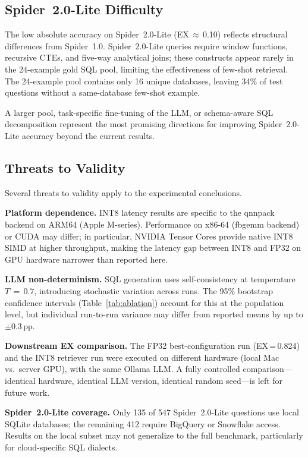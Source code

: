\subsection{Spider~2.0-Lite Difficulty}

The low absolute accuracy on Spider~2.0-Lite (EX\,$\approx$\,0.10)
reflects structural differences from Spider~1.0.
Spider~2.0-Lite queries require window functions, recursive CTEs,
and five-way analytical joins; these constructs appear rarely in the
24-example gold SQL pool, limiting the effectiveness of few-shot retrieval.
The 24-example pool contains only 16 unique databases, leaving 34\%
of test questions without a same-database few-shot example.

A larger pool, task-specific fine-tuning of the LLM, or schema-aware
SQL decomposition represent the most promising directions
for improving Spider~2.0-Lite accuracy beyond the current results.

\subsection{Threats to Validity}
\label{sec:threats}

Several threats to validity apply to the experimental conclusions.

\textbf{Platform dependence.}
INT8 latency results are specific to the qnnpack backend on ARM64 (Apple
M-series).
Performance on x86-64 (fbgemm backend) or CUDA may differ; in particular,
NVIDIA Tensor Cores provide native INT8 SIMD at higher throughput,
making the latency gap between INT8 and FP32 on GPU hardware narrower
than reported here.

\textbf{LLM non-determinism.}
SQL generation uses self-consistency at temperature $T\,=\,0.7$, introducing
stochastic variation across runs.
The 95\% bootstrap confidence intervals (Table~\ref{tab:ablation}) account
for this at the population level, but individual run-to-run variance
may differ from reported means by up to $\pm$0.3\,pp.

\textbf{Downstream EX comparison.}
The FP32 best-configuration run (EX\,=\,0.824) and the INT8 retriever
run were executed on different hardware (local Mac vs.\ server GPU), with
the same Ollama LLM.
A fully controlled comparison---identical hardware, identical LLM version,
identical random seed---is left for future work.

\textbf{Spider~2.0-Lite coverage.}
Only 135 of 547 Spider~2.0-Lite questions use local SQLite databases;
the remaining 412 require BigQuery or Snowflake access.
Results on the local subset may not generalize to the full benchmark,
particularly for cloud-specific SQL dialects.

